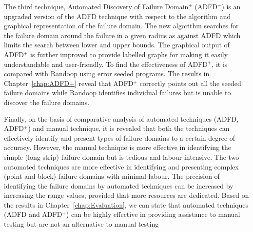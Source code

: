 The third technique, Automated Discovery of Failure Domain$^+$ (ADFD$^+$) is an upgraded version of the ADFD technique with respect to the algorithm and graphical representation of the failure domain. The new algorithm searches for the failure domain around the failure in a given radius as against ADFD which limits the search between lower and upper bounds. The graphical output of ADFD$^+$ is further improved to provide labelled graphs for making it easily understandable and user-friendly. To find the effectiveness of ADFD$^+$, it is compared with Randoop using error seeded programs. The results in Chapter~\ref{chap:ADFD+} reveal that ADFD$^+$ correctly points out all the seeded failure domains while Randoop identifies individual failures but is unable to discover the failure domains. 

Finally, on the basis of comparative analysis of automated techniques (ADFD, ADFD$^+$) and manual technique, it is revealed that both the techniques can effectively identify and present types of failure domains to a certain degree of accuracy. However, the manual technique is more effective in identifying the simple (long strip) failure domain but is tedious and labour intensive. The two automated techniques are more effective in identifying and presenting complex (point and block) failure domains with minimal labour. The precision of identifying the failure domains by automated techniques can be increased by increasing the range values, provided that more resources are dedicated. Based on the results in Chapter~\ref{chap:Evaluation}, we can state that automated techniques (ADFD and ADFD$^+$) can be highly effective in providing assistance to manual testing but are not an alternative to manual testing

\bigskip





